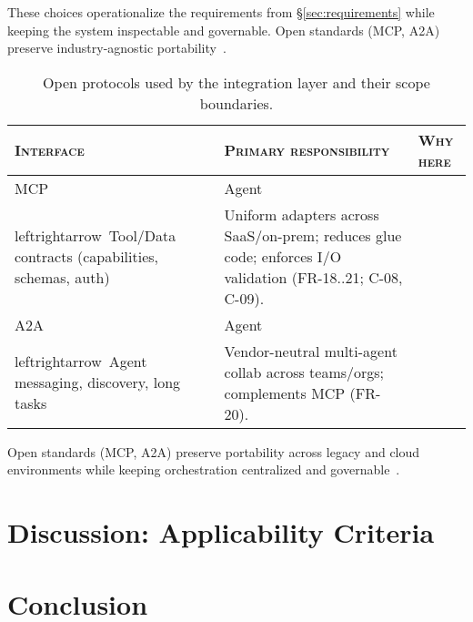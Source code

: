 \noindent These choices operationalize the requirements from §\ref{sec:requirements} while keeping the system inspectable and governable. Open standards (MCP, A2A) preserve industry-agnostic portability~\parencite{anthropic_mcp,google_a2a}.

\begin{table}[h!]
  \centering
  \small
  \begin{tabular}{p{3.4cm} p{5.4cm} p{5.8cm}}
    \toprule
    \textsc{Interface} & \textsc{Primary responsibility} & \textsc{Why here} \\
    \midrule
    MCP~\cite{anthropic_mcp} & Agent \\leftrightarrow\ Tool/Data contracts (capabilities, schemas, auth) & Uniform adapters across SaaS/on-prem; reduces glue code; enforces I/O validation (\textsc{FR-18..21; C-08, C-09}). \\
    A2A~\cite{google_a2a} & Agent \\leftrightarrow\ Agent messaging, discovery, long tasks & Vendor-neutral multi-agent collab across teams/orgs; complements MCP (\textsc{FR-20}). \\
    \bottomrule
  \end{tabular}
  \caption{Open protocols used by the integration layer and their scope boundaries.}
\end{table}

Open standards (MCP, A2A) preserve portability across legacy and cloud environments while keeping orchestration centralized and governable~\parencite{anthropic_mcp,google_a2a}.

\section{Discussion: Applicability Criteria}\label{sec:discussion}

\section{Conclusion}\label{sec:conclussion}

